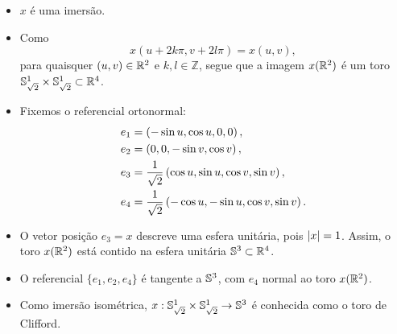 \documentclass[10pt,a4paper]{beamer}
\theoremstyle{definition}
\begin{document}
\begin{frame}

	\begin{itemize}
		\item $x$ é uma imersão.
		
		\pause
	
		\item Como 
		\[x(u + 2k \pi, v + 2l \pi) = x(u,v), \] 
		para quaisquer $(u,v) \in \mathbb R^2$ e $k,l \in \mathbb{Z}$, segue que a imagem $x(\mathbb R^2)$ é um toro $\mathbb{S}_{\sqrt{2}}^1 \times \mathbb{S}_{\sqrt{2}}^1 \subset \mathbb R^4$.
		
		\pause
		
		\item Fixemos o referencial ortonormal:
		\begin{align*}
		e_1 &= \left( -\sin u, \cos u, 0, 0 \right),\\
		e_2 &= \left( 0,0, -\sin v, \cos v \right),\\
		e_3 &= \frac{1}{\sqrt{2}} \left( \cos u, \sin u, \cos v, \sin v \right),\\
		e_4 &= \frac{1}{\sqrt{2}} \left( -\cos u, -\sin u, \cos v, \sin v \right).
		\end{align*}
		
	\end{itemize}

\end{frame}

\begin{frame}

	\begin{itemize}
		
		\item O vetor posição $e_3 = x$ descreve uma esfera unitária, pois $\left| x \right| = 1$. Assim, o toro $x(\mathbb R^2)$ está contido na esfera unitária $\mathbb{S}^3 \subset \mathbb R^4$.
		
		\pause
		
		\item O referencial $\{e_1,e_2,e_4\}$ é tangente a $\mathbb{S}^3$, com
		$e_4$ normal ao toro $x(\mathbb R^2)$.
		
		\pause
		
		\item Como imersão isométrica, $x: \mathbb{S}_{\sqrt{2}}^1 \times \mathbb{S}_{\sqrt{2}}^1 \rightarrow \mathbb{S}^3$ é conhecida como o \alert{toro de Clifford}.
		
	\end{itemize}

\end{frame}
\end{document}
